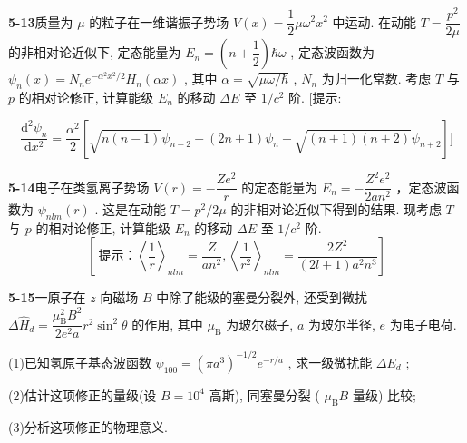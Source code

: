 \vfill

\newpage

\textbf{5-13}\quad 质量为 $\displaystyle \mu$ 的粒子在一维谐振子势场 $\displaystyle V(x) = \dfrac{1}{2}\mu \omega^2 x^2$ 中运动. 在动能 $\displaystyle T = \dfrac{p^2}{2\mu}$ 的非相对论近似下, 定态能量为 $\displaystyle E_n = \left(n + \dfrac{1}{2}\right)\hbar \omega$ , 定态波函数为 $\displaystyle \psi_n(x) = N_n e^{-\alpha^2 x^2 / 2} H_n(\alpha x)$ , 其中 $\displaystyle \alpha = \sqrt{\mu \omega / \hbar}$ , $\displaystyle N_n$ 为归一化常数. 考虑 $\displaystyle T$ 与 $\displaystyle p$ 的相对论修正, 计算能级 $\displaystyle E_n$ 的移动 $\displaystyle \Delta E$ 至 $\displaystyle 1 / c^2$ 阶. [提示:

$$
\dfrac {\mathrm{d} ^ {2} \psi_ {n}}{\mathrm{d} x ^ {2}} = \dfrac {\alpha^ {2}}{2} \left[ \sqrt {n (n - 1)} \psi_ {n - 2} - (2 n + 1) \psi_ {n} + \sqrt {(n + 1) (n + 2)} \psi_ {n + 2} \right] ]
$$

\vfill

\newpage

\textbf{5-14}\quad 电子在类氢离子势场 $\displaystyle V(r) = -\dfrac{Ze^2}{r}$ 的定态能量为 $\displaystyle E_{n} = -\dfrac{Z^{2}e^{2}}{2an^{2}}$ ，定态波函数为 $\displaystyle \psi_{nlm}(r)$ . 这是在动能 $\displaystyle T = p^{2} / 2\mu$ 的非相对论近似下得到的结果. 现考虑 $\displaystyle T$ 与 $\displaystyle p$ 的相对论修正, 计算能级 $\displaystyle E_{n}$ 的移动 $\displaystyle \Delta E$ 至 $\displaystyle 1 / c^{2}$ 阶.
$$
\left[\ \text{提示：} \left\langle \dfrac {1}{r} \right\rangle_ {n l m} = \dfrac {Z}{a n ^ {2}}, \left\langle \dfrac {1}{r ^ {2}} \right\rangle_ {n l m} = \dfrac {2 Z ^ {2}}{(2 l + 1) a ^ {2} n ^ {3}} \right]
$$

\vfill

\newpage

\textbf{5-15}\quad 一原子在 $\displaystyle z$ 向磁场 $\displaystyle B$ 中除了能级的塞曼分裂外, 还受到微扰 $\displaystyle \Delta \hat{H}_d = \dfrac{\mu_{\mathrm{B}}^2 B^2}{2e^2 a} r^2 \sin^2 \theta$ 的作用, 其中 $\displaystyle \mu_{\mathrm{B}}$ 为玻尔磁子, $\displaystyle a$ 为玻尔半径, $\displaystyle e$ 为电子电荷.

(1)已知氢原子基态波函数 $\displaystyle \psi_{100} = (\pi a^3)^{-1/2} e^{-r/a}$ , 求一级微扰能 $\displaystyle \Delta E_d$ ;

(2)估计这项修正的量级(设 $\displaystyle B = 10^4$ 高斯), 同塞曼分裂 ( $\displaystyle \mu_{\mathrm{B}} B$ 量级) 比较;

(3)分析这项修正的物理意义.

\vfill

